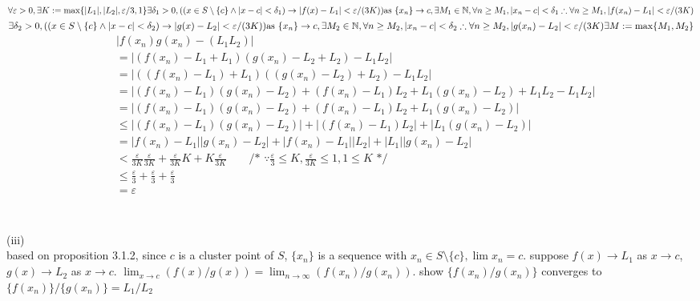\documentclass[12pt, border = 4pt, multi]{article} %
\begin{document}
$\forall \varepsilon > 0, \exists K := \max\{|L_1|, |L_2|, \varepsilon / 3, 1\}\\
\exists \delta_1 > 0, ((x \in S \setminus \{c\} \wedge |x - c| < \delta_1) \rightarrow |f(x) - L_1| < \varepsilon / (3K))\\
\text{as } \{x_n\} \rightarrow c, \exists M_1 \in \mathbb{N}, \forall n \geq M_1, |x_n - c| < \delta_1\\
\therefore \forall n \geq M_1, |f(x_n) - L_1| < \varepsilon / (3K)\\$
$\exists \delta_2 > 0, ((x \in S \setminus \{c\} \wedge |x - c| < \delta_2) \rightarrow |g(x) - L_2| < \varepsilon / (3K))\\
\text{as } \{x_n\} \rightarrow c, \exists M_2 \in \mathbb{N}, \forall n \geq M_2, |x_n - c| < \delta_2\\
\therefore \forall n \geq M_2, |g(x_n) - L_2| < \varepsilon / (3K)\\
\exists M := \max\{M_1, M_2\}$
\begin{align*}
&|f(x_n)g(x_n) - (L_1 L_2)|\\
&= |(f(x_n) - L_1 + L_1)(g(x_n) - L_2 + L_2) - L_1 L_2|\\
&= |((f(x_n) - L_1) + L_1)((g(x_n) - L_2) + L_2) - L_1 L_2|\\
&= |(f(x_n) - L_1)(g(x_n) - L_2) + (f(x_n) - L_1) L_2 + L_1 (g(x_n) - L_2) + L_1 L_2 - L_1 L_2|\\
&= |(f(x_n) - L_1)(g(x_n) - L_2) + (f(x_n) - L_1) L_2 + L_1 (g(x_n) - L_2)|\\
&\leq |(f(x_n) - L_1)(g(x_n) - L_2)| + |(f(x_n) - L_1) L_2| + |L_1 (g(x_n) - L_2)|\\
&= |f(x_n) - L_1||g(x_n) - L_2| + |f(x_n) - L_1||L_2| + |L_1||g(x_n) - L_2|\\
&< \frac{\varepsilon}{3K}\frac{\varepsilon}{3K} + \frac{\varepsilon}{3K}K + K\frac{\varepsilon}{3K} \qquad \text{/* } \because \frac{\varepsilon}{3} \leq K, \frac{\varepsilon}{3K} \leq 1, 1 \leq K \text{ */}\\
&\leq \frac{\varepsilon}{3} + \frac{\varepsilon}{3} + \frac{\varepsilon}{3}\\
&= \varepsilon\\
\end{align*}
\\
\\
(iii)\\
based on proposition 3.1.2, since $c$ is a cluster point of $S$, $\{x_n\}$ is a sequence with $x_n \in S \setminus \{c\}, \lim x_n = c$. suppose $f(x) \rightarrow L_1$ as $x \rightarrow c$, $g(x) \rightarrow L_2$ as $x \rightarrow c$. $\lim_{x \rightarrow c} (f(x) / g(x)) = \lim_{n \rightarrow \infty} (f(x_n) / g(x_n))$. show $\{f(x_n) / g(x_n)\}$ converges to $\{f(x_n)\} / \{g(x_n)\} = L_1 / L_2$
\end{document}

